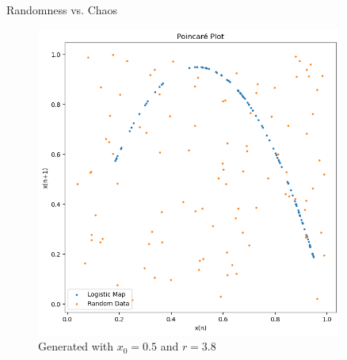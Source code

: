\documentclass[
	11pt, %
]{beamer}
\begin{document}
\begin{frame}{Randomness vs. Chaos}
\begin{figure}
\begin{minipage}{0.45\textwidth}
    \end{minipage}\hfill
    \begin{minipage}{0.3\textwidth}
        \centering
        \includegraphics[width=0.9\textwidth]{./figures/Poincare} %
    \end{minipage}
            \caption{Generated with $x_0=0.5$ and $r=3.8$}
\end{figure}
\end{frame}
\end{document}
